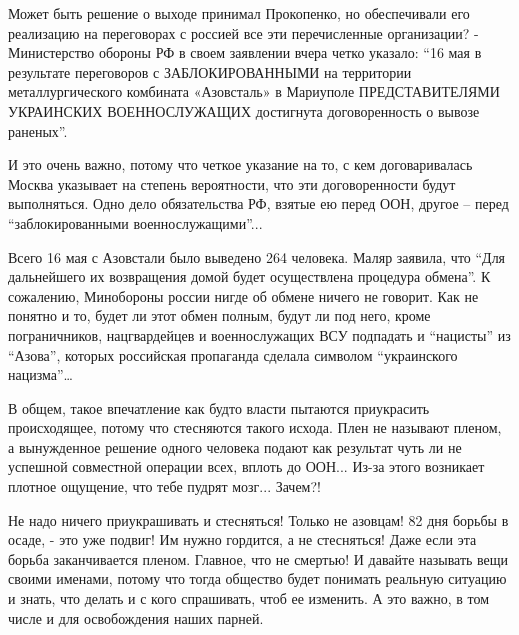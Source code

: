 Может быть решение о выходе принимал Прокопенко, но обеспечивали его реализацию
на переговорах с россией все эти перечисленные организации?  -  Министерство
обороны РФ  в своем заявлении вчера четко указало: \enquote{16 мая в результате
переговоров с ЗАБЛОКИРОВАННЫМИ на территории металлургического комбината
«Азовсталь» в Мариуполе ПРЕДСТАВИТЕЛЯМИ УКРАИНСКИХ ВОЕННОСЛУЖАЩИХ достигнута
договоренность о вывозе раненых}. 

И это очень важно, потому что четкое указание на то, с кем договаривалась
Москва указывает на степень вероятности, что эти договоренности будут
выполняться. Одно дело обязательства РФ, взятые ею перед ООН, другое – перед
\enquote{заблокированными военнослужащими}...

Всего 16 мая с Азовстали было выведено 264 человека. Маляр заявила, что \enquote{Для
дальнейшего их возвращения домой будет осуществлена процедура обмена}.   К
сожалению, Минобороны россии нигде об обмене ничего не говорит. Как не понятно
и то, будет ли этот обмен полным, будут ли под него, кроме пограничников,
нацгвардейцев  и военнослужащих ВСУ подпадать и \enquote{нацисты} из \enquote{Азова}, которых
российская пропаганда сделала символом \enquote{украинского нацизма}…

В общем, такое впечатление как будто власти пытаются приукрасить происходящее,
потому что стесняются такого исхода. Плен не называют пленом, а вынужденное
решение одного человека подают как результат чуть ли не успешной совместной
операции всех, вплоть до ООН...  Из-за этого возникает плотное ощущение, что тебе
пудрят мозг... Зачем?! 

Не надо ничего приукрашивать и стесняться! Только не азовцам! 82 дня борьбы в
осаде, - это уже подвиг! Им нужно гордится, а не стесняться!  Даже если эта
борьба заканчивается пленом. Главное, что не смертью!  И давайте называть вещи
своими именами, потому что тогда общество будет понимать реальную ситуацию и
знать, что делать и с кого спрашивать, чтоб ее изменить.  А это важно, в том
числе и для освобождения наших парней.

